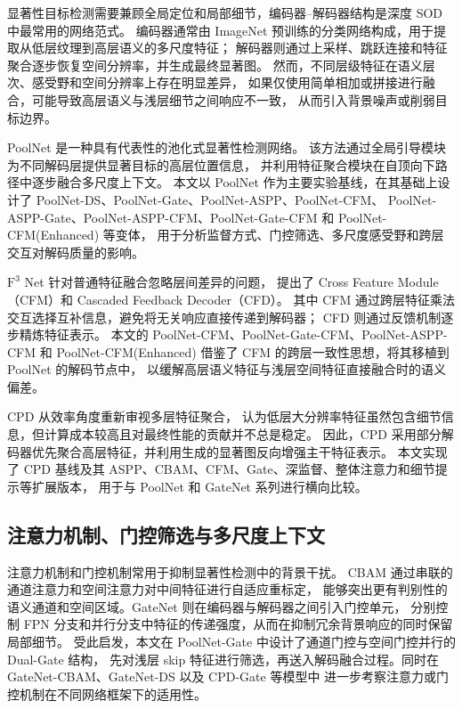 \documentclass[UTF8,a4paper,10pt]{ctexart}
\begin{document}
显著性目标检测需要兼顾全局定位和局部细节，编码器--解码器结构是深度 SOD 中最常用的网络范式。
编码器通常由 ImageNet 预训练的分类网络构成，用于提取从低层纹理到高层语义的多尺度特征；
解码器则通过上采样、跳跃连接和特征聚合逐步恢复空间分辨率，并生成最终显著图。
然而，不同层级特征在语义层次、感受野和空间分辨率上存在明显差异，
如果仅使用简单相加或拼接进行融合，可能导致高层语义与浅层细节之间响应不一致，
从而引入背景噪声或削弱目标边界。

PoolNet \cite{liu2019simple} 是一种具有代表性的池化式显著性检测网络。
该方法通过全局引导模块为不同解码层提供显著目标的高层位置信息，
并利用特征聚合模块在自顶向下路径中逐步融合多尺度上下文。
本文以 PoolNet 作为主要实验基线，在其基础上设计了 PoolNet-DS、PoolNet-Gate、PoolNet-ASPP、PoolNet-CFM、
PoolNet-ASPP-Gate、PoolNet-ASPP-CFM、PoolNet-Gate-CFM 和 PoolNet-CFM(Enhanced) 等变体，
用于分析监督方式、门控筛选、多尺度感受野和跨层交互对解码质量的影响。

$\text{F}^3$ Net \cite{wei2020f3net} 针对普通特征融合忽略层间差异的问题，
提出了 Cross Feature Module（CFM）和 Cascaded Feedback Decoder（CFD）。
其中 CFM 通过跨层特征乘法交互选择互补信息，避免将无关响应直接传递到解码器；
CFD 则通过反馈机制逐步精炼特征表示。
本文的 PoolNet-CFM、PoolNet-Gate-CFM、PoolNet-ASPP-CFM 和 PoolNet-CFM(Enhanced)
借鉴了 CFM 的跨层一致性思想，将其移植到 PoolNet 的解码节点中，
以缓解高层语义特征与浅层空间特征直接融合时的语义偏差。

CPD \cite{wu2019cascaded} 从效率角度重新审视多层特征聚合，
认为低层大分辨率特征虽然包含细节信息，但计算成本较高且对最终性能的贡献并不总是稳定。
因此，CPD 采用部分解码器优先聚合高层特征，并利用生成的显著图反向增强主干特征表示。
本文实现了 CPD 基线及其 ASPP、CBAM、CFM、Gate、深监督、整体注意力和细节提示等扩展版本，
用于与 PoolNet 和 GateNet 系列进行横向比较。

\subsection{注意力机制、门控筛选与多尺度上下文}

注意力机制和门控机制常用于抑制显著性检测中的背景干扰。
CBAM \cite{woo2018cbam} 通过串联的通道注意力和空间注意力对中间特征进行自适应重标定，
能够突出更有判别性的语义通道和空间区域。GateNet \cite{zhao2020suppress} 则在编码器与解码器之间引入门控单元，
分别控制 FPN 分支和并行分支中特征的传递强度，从而在抑制冗余背景响应的同时保留局部细节。
受此启发，本文在 PoolNet-Gate 中设计了通道门控与空间门控并行的 Dual-Gate 结构，
先对浅层 skip 特征进行筛选，再送入解码融合过程。同时在 GateNet-CBAM、GateNet-DS 以及 CPD-Gate 等模型中
进一步考察注意力或门控机制在不同网络框架下的适用性。
\end{document}
